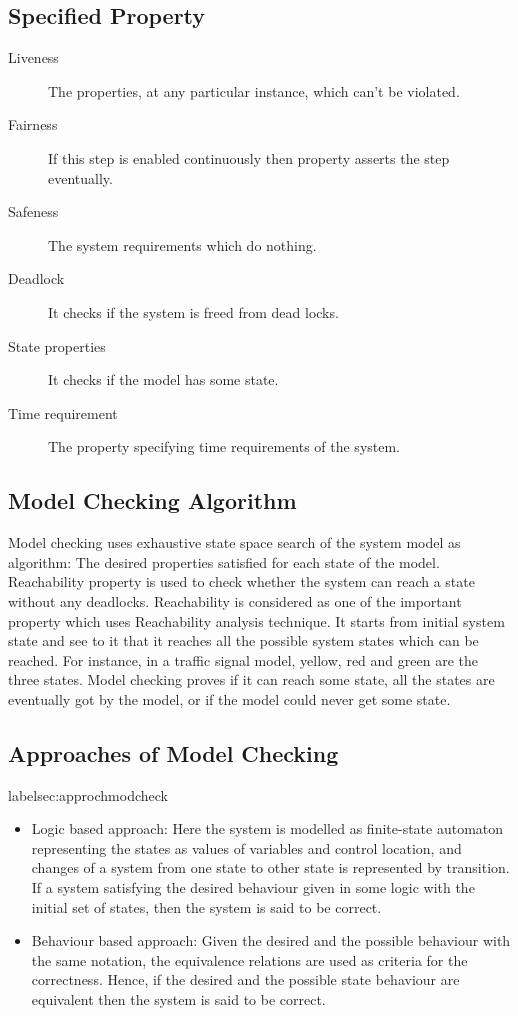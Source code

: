 \documentclass{article}
\begin{document}
                                                
\subsection{Specified Property}
\label{sec:specprop}


\begin{description}
\item[Liveness] The properties, at any particular instance, which can’t be violated.
\item[Fairness] If this step is enabled continuously then property asserts the step eventually.
\item[Safeness] The system requirements which do nothing.
\item[Deadlock] It checks if the system is freed from dead locks.
\item[State properties]It checks if the model has some state.
\item[Time requirement]The property specifying time requirements of the system. 
\end{description}


\subsection{Model Checking Algorithm}
\label{sec:modcheckalg}


Model checking uses exhaustive state space search of the system model as 	algorithm: The desired properties satisfied for each state of the model. 	Reachability property is used to check whether the system can reach a state without any deadlocks. Reachability is considered as one of the important property which uses Reachability analysis technique. It starts from initial system state and see to it that it reaches all the possible system states which can be reached. For instance, in a traffic signal model, yellow, red and green are the three states. Model checking proves if it can reach some state, all the states are eventually got by the model, or if the model could never get some state.


\subsection{Approaches of Model Checking}
label{sec:approchmodcheck}
\begin{itemize}


\item Logic based approach: Here the system is modelled as finite-state automaton representing the states as values of variables and control location, and changes of a system from one state to other state is represented by transition. If a system satisfying the desired behaviour given in some logic with the initial set of states, then the system is said to be correct.
\item Behaviour based approach: Given the desired and the possible behaviour with the same notation, the equivalence relations are used as criteria for the correctness. Hence, if the desired and the possible state behaviour are equivalent then the system is said to be correct. 
\end{itemize} 
\end{document}
